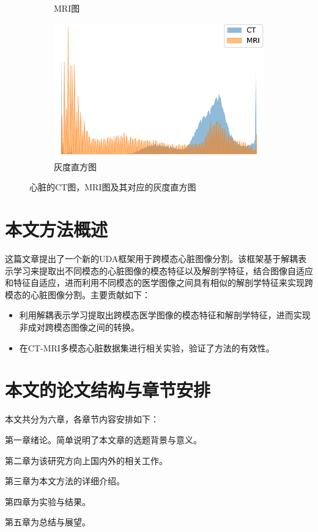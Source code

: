 \begin{figure}
\begin{subfigure}{0.3\textwidth}
        \caption{MRI图}
        \label{hist:b}
    \end{subfigure}
    \hfill
    \begin{subfigure}{0.3\textwidth}
        \includegraphics[width=\textwidth,height=.8\textwidth]{image/chap01/hist.pdf}
        \caption{灰度直方图}
        \label{hist:c}
    \end{subfigure}
    \caption{心脏的CT图，MRI图及其对应的灰度直方图}
    \label{fig:hist}
    \end{figure}


\section{本文方法概述}
\label{sec:contributions}
这篇文章提出了一个新的UDA框架用于跨模态心脏图像分割。该框架基于解耦表示学习来提取出不同模态的心脏图像的模态特征以及解剖学特征，结合图像自适应和特征自适应，进而利用不同模态的医学图像之间具有相似的解剖学特征来实现跨模态的心脏图像分割。主要贡献如下：
\begin{itemize}
    \item 利用解耦表示学习提取出跨模态医学图像的模态特征和解剖学特征，进而实现非成对跨模态图像之间的转换。
    \item 在CT-MRI多模态心脏数据集进行相关实验，验证了方法的有效性。
\end{itemize}

\newpage
\section{本文的论文结构与章节安排}
\label{sec:arrangement}

本文共分为六章，各章节内容安排如下：

第一章绪论。简单说明了本文章的选题背景与意义。

第二章为该研究方向上国内外的相关工作。

第三章为本文方法的详细介绍。

第四章为实验与结果。

第五章为总结与展望。

